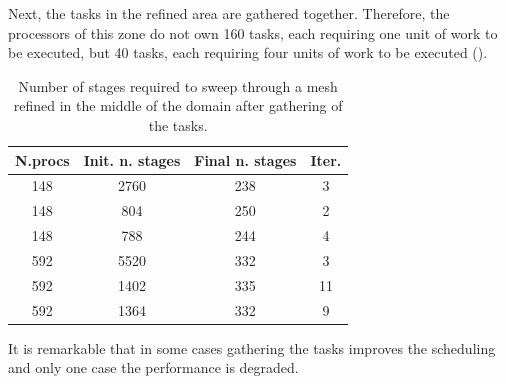 \documentclass[letterpaper]{article}
\renewcommand{\(}{\left(}
\renewcommand{\)}{\right)}
\renewcommand{\[}{\left[}
\renewcommand{\]}{\right]}
\begin{document}
Next, the tasks in the refined area are gathered together. Therefore, the
processors of this zone do not own 160 tasks, each requiring one unit of work to
be executed, but 40 tasks, each requiring four units of work to be executed
(). 
\begin{table}[H]
  \begin{center}
    \begin{tabular}{|c|c|c|c|}
      \hline
      N.procs & Init. n. stages & Final n. stages & Iter. \\
      \hline
      148 & 2760 & 238 & 3  \\
      148 & 804  & 250 & 2  \\
      148 & 788  & 244 & 4  \\
      592 & 5520 & 332 & 3  \\
      592 & 1402 & 335 & 11 \\
      592 & 1364 & 332 & 9  \\
      \hline
    \end{tabular}
    \caption{Number of stages required to sweep through a mesh refined in the
      middle of the domain after gathering of the tasks.}
    \label{amr_2}
  \end{center}
\end{table}

It is remarkable that in some cases gathering the tasks improves the scheduling
and only one case the performance is degraded.
\end{document}
